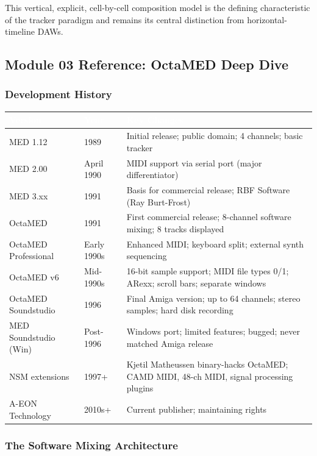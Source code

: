 \documentclass[11pt,letterpaper]{article}
\newcommand{\tableheader}[1]{\textbf{\sffamily\textcolor{white}{#1}}}
\begin{document}
This vertical, explicit, cell-by-cell composition model is the defining characteristic of the tracker paradigm and remains its central distinction from horizontal-timeline DAWs.

\subsection{Module 03 Reference: OctaMED Deep Dive}

\subsubsection{Development History}

\begin{center}
\begin{tabularx}{\textwidth}{L{2.5cm}L{3cm}X}
\toprule
{}
\tableheader{Version} & \tableheader{Year} & \tableheader{Key Changes} \\
\midrule
MED 1.12 & 1989 & Initial release; public domain; 4 channels; basic tracker \\
MED 2.00 & April 1990 & MIDI support via serial port (major differentiator) \\
MED 3.xx & 1991 & Basis for commercial release; RBF Software (Ray Burt-Frost) \\
OctaMED & 1991 & First commercial release; 8-channel software mixing; 8 tracks displayed \\
OctaMED Professional & Early 1990s & Enhanced MIDI; keyboard split; external synth sequencing \\
OctaMED v6 & Mid-1990s & 16-bit sample support; MIDI file types 0/1; ARexx; scroll bars; separate windows \\
OctaMED Soundstudio & 1996 & Final Amiga version; up to 64 channels; stereo samples; hard disk recording \\
MED Soundstudio (Win) & Post-1996 & Windows port; limited features; bugged; never matched Amiga release \\
NSM extensions & 1997+ & Kjetil Matheussen binary-hacks OctaMED; CAMD MIDI, 48-ch MIDI, signal processing plugins \\
A-EON Technology & 2010s+ & Current publisher; maintaining rights \\
\bottomrule
\end{tabularx}
\end{center}

\subsubsection{The Software Mixing Architecture}
\end{document}

